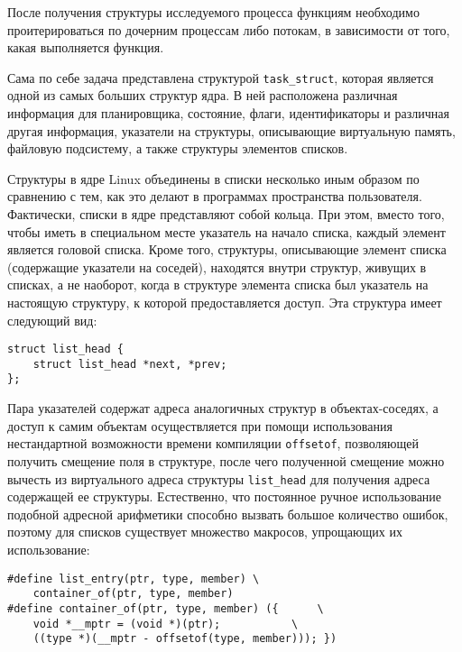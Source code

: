 После получения структуры исследуемого процесса функциям необходимо
проитерироваться по дочерним процессам либо потокам, в зависимости от того,
какая выполняется функция.

Сама по себе задача представлена структурой \texttt{task\_struct}, которая
является одной из самых больших структур ядра. В ней расположена различная
информация для планировщика, состояние, флаги, идентификаторы и различная другая
информация, указатели на структуры, описывающие виртуальную память, файловую
подсистему, а также структуры элементов списков.

Структуры в ядре Linux объединены в списки несколько иным образом по сравнению с
тем, как это делают в программах пространства пользователя. Фактически, списки в
ядре представляют собой кольца. При этом, вместо того, чтобы иметь в специальном
месте указатель на начало списка, каждый элемент является головой списка. Кроме
того, структуры, описывающие элемент списка (содержащие указатели на соседей),
находятся внутри структур, живущих в списках, а не наоборот, когда в структуре
элемента списка был указатель на настоящую структуру, к которой предоставляется
доступ. Эта структура имеет следующий вид:
\medskip
\begin{lstlisting}[style=cstyle]
struct list_head {
	struct list_head *next, *prev;
};
\end{lstlisting}
\medskip

Пара указателей содержат адреса аналогичных структур в объектах-соседях, а
доступ к самим объектам осуществляется при помощи использования нестандартной
возможности времени компиляции \texttt{offsetof}, позволяющей получить смещение
поля в структуре, после чего полученной смещение можно вычесть из виртуального
адреса структуры \texttt{list\_head} для получения адреса содержащей ее
структуры. Естественно, что постоянное ручное использование подобной адресной
арифметики способно вызвать большое количество ошибок, поэтому для списков
существует множество макросов, упрощающих их использование:
\medskip
\begin{lstlisting}[style=cstyle]
#define list_entry(ptr, type, member) \
	container_of(ptr, type, member)
#define container_of(ptr, type, member) ({		\
	void *__mptr = (void *)(ptr);			\
	((type *)(__mptr - offsetof(type, member))); })
\end{lstlisting}
\medskip

